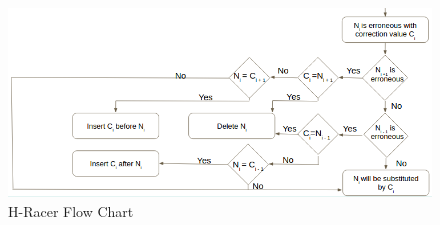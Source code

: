 \documentclass[12pt]{llncs}
\begin{document}
\begin{figure}
	\centering
	\includegraphics[width=1.3\linewidth]{./figs/Second-Proposal-1}
	\caption{\label{fig:fig-Second-Proposal-1}H-Racer Flow Chart}
\end{figure}
\end{document}

